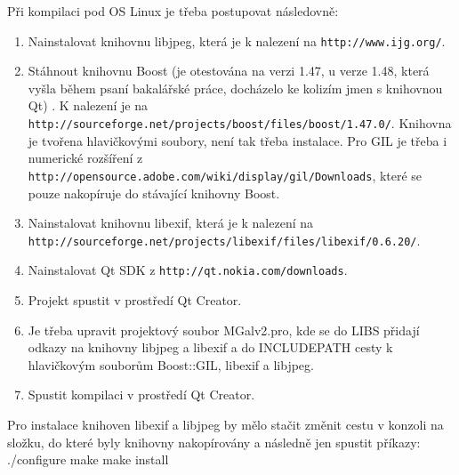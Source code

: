 \documentclass[11pt,twoside,a4paper]{book}
\begin{document}
\indent
Při kompilaci pod OS Linux je třeba postupovat následovně:
\begin{enumerate}
\item Nainstalovat knihovnu libjpeg, která je k nalezení na \verb|http://www.ijg.org/|.
\item Stáhnout knihovnu Boost (je otestována na verzi 1.47, u verze 1.48, která vyšla během psaní bakalářské práce, docházelo ke kolizím jmen s knihovnou Qt) . K nalezení je na \verb|http://sourceforge.net/projects/boost/files/boost/1.47.0/|. Knihovna je tvořena hlavičkovými soubory, není tak třeba instalace. Pro GIL je třeba i numerické rozšíření z \verb|http://opensource.adobe.com/wiki/display/gil/Downloads|, které se pouze nakopíruje do stávající knihovny Boost.
\item Nainstalovat knihovnu libexif, která je k nalezení na 
\newline \verb|http://sourceforge.net/projects/libexif/files/libexif/0.6.20/|.
\item Nainstalovat Qt SDK z \verb|http://qt.nokia.com/downloads|.
\item Projekt spustit v prostředí Qt Creator.
\item Je třeba upravit projektový soubor MGalv2.pro, kde se do LIBS přidají odkazy na knihovny libjpeg a libexif a do INCLUDEPATH cesty k hlavičkovým souborům Boost::GIL, libexif a libjpeg.
\item Spustit kompilaci v prostředí Qt Creator.
\end{enumerate}

\indent
Pro instalace knihoven libexif a libjpeg by mělo stačit změnit cestu v konzoli na složku, do které byly knihovny nakopírovány a následně jen spustit příkazy:
\newline ./configure
\newline make
\newline make install

\end{document}
